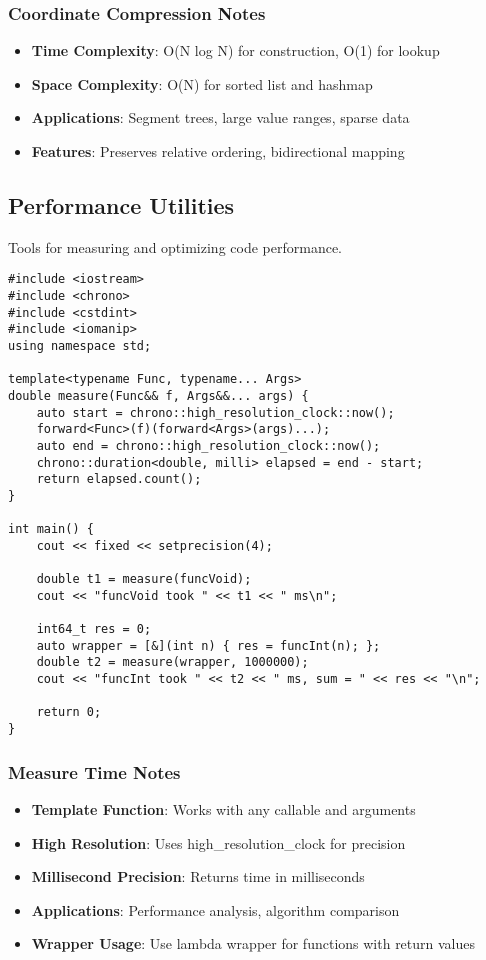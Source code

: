 \documentclass[11pt,a4paper]{article}
\begin{document}
\subsubsection*{Coordinate Compression Notes}
\begin{itemize}
\item \textbf{Time Complexity}: O(N log N) for construction, O(1) for lookup
\item \textbf{Space Complexity}: O(N) for sorted list and hashmap
\item \textbf{Applications}: Segment trees, large value ranges, sparse data
\item \textbf{Features}: Preserves relative ordering, bidirectional mapping
\end{itemize}

\newpage

\subsection{Performance Utilities}
Tools for measuring and optimizing code performance.

\begin{lstlisting}[caption={Measure Time Utility}]
#include <iostream>
#include <chrono>
#include <cstdint>
#include <iomanip>  
using namespace std;

template<typename Func, typename... Args>
double measure(Func&& f, Args&&... args) {
    auto start = chrono::high_resolution_clock::now();
    forward<Func>(f)(forward<Args>(args)...);
    auto end = chrono::high_resolution_clock::now();
    chrono::duration<double, milli> elapsed = end - start;
    return elapsed.count();
}

int main() {
    cout << fixed << setprecision(4);

    double t1 = measure(funcVoid);
    cout << "funcVoid took " << t1 << " ms\n";

    int64_t res = 0;
    auto wrapper = [&](int n) { res = funcInt(n); };
    double t2 = measure(wrapper, 1000000);
    cout << "funcInt took " << t2 << " ms, sum = " << res << "\n";

    return 0;
}
\end{lstlisting}

\subsubsection*{Measure Time Notes}
\begin{itemize}
\item \textbf{Template Function}: Works with any callable and arguments
\item \textbf{High Resolution}: Uses high\_resolution\_clock for precision
\item \textbf{Millisecond Precision}: Returns time in milliseconds
\item \textbf{Applications}: Performance analysis, algorithm comparison
\item \textbf{Wrapper Usage}: Use lambda wrapper for functions with return values
\end{itemize}
\end{document}
